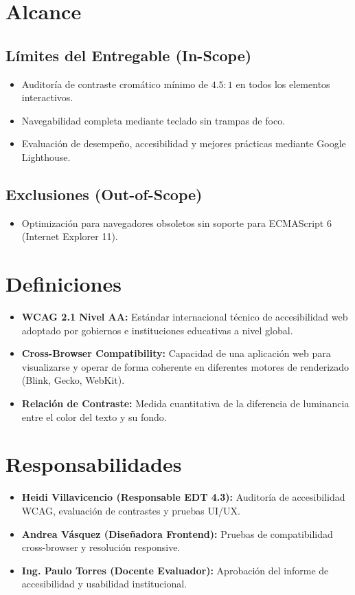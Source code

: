 \documentclass[12pt,a4paper]{article}
\begin{document}
\section{Alcance}
\subsection{Límites del Entregable (In-Scope)}
\begin{itemize}[leftmargin=1.5em, itemsep=2pt]
    \item Auditoría de contraste cromático mínimo de $4.5:1$ en todos los elementos interactivos.
    \item Navegabilidad completa mediante teclado sin trampas de foco.
    \item Evaluación de desempeño, accesibilidad y mejores prácticas mediante Google Lighthouse.
\end{itemize}
\subsection{Exclusiones (Out-of-Scope)}
\begin{itemize}[leftmargin=1.5em, itemsep=2pt]
    \item Optimización para navegadores obsoletos sin soporte para ECMAScript 6 (Internet Explorer 11).
\end{itemize}

\section{Definiciones}
\begin{itemize}[leftmargin=1.5em, itemsep=2pt]
    \item \textbf{WCAG 2.1 Nivel AA:} Estándar internacional técnico de accesibilidad web adoptado por gobiernos e instituciones educativas a nivel global.
    \item \textbf{Cross-Browser Compatibility:} Capacidad de una aplicación web para visualizarse y operar de forma coherente en diferentes motores de renderizado (Blink, Gecko, WebKit).
    \item \textbf{Relación de Contraste:} Medida cuantitativa de la diferencia de luminancia entre el color del texto y su fondo.
\end{itemize}

\section{Responsabilidades}
\begin{itemize}[leftmargin=1.5em, itemsep=2pt]
    \item \textbf{Heidi Villavicencio (Responsable EDT 4.3):} Auditoría de accesibilidad WCAG, evaluación de contrastes y pruebas UI/UX.
    \item \textbf{Andrea Vásquez (Diseñadora Frontend):} Pruebas de compatibilidad cross-browser y resolución responsive.
    \item \textbf{Ing. Paulo Torres (Docente Evaluador):} Aprobación del informe de accesibilidad y usabilidad institucional.
\end{itemize}
\end{document}
